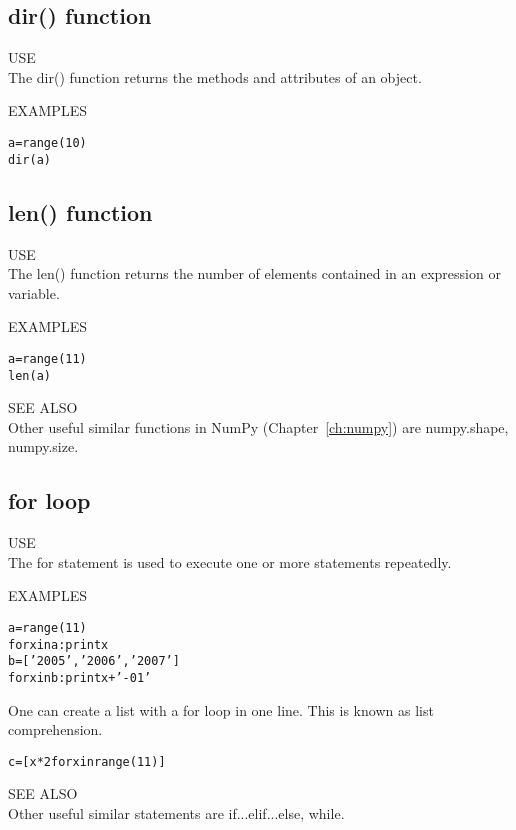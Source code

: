 \subsection{ {\sf dir() } function}
{\color{blue} {\sf\small USE}} \\
The {\sf\small dir()} function returns the methods and attributes of
an object.
  
{\color{blue} {\sf\small EXAMPLES}} 
\begin{alltt}
\pytab a = range(10) 
\pytab dir(a) 
\end{alltt}

\subsection{ {\sf len() } function}
{\color{blue} {\sf\small USE}} \\
The {\sf\small len()} function returns the number of elements
contained in an expression or variable.

{\color{blue} {\sf\small EXAMPLES}} 
\begin{alltt}
\pytab a = range(11) 
\pytab len(a) 
\end{alltt}
{\color{blue} {\sf\small SEE ALSO}} \\
Other useful similar functions in NumPy (Chapter~\ref{ch:numpy}) are
{\sf\small numpy.shape, numpy.size}.


\subsection{ {\sf for } loop}
{\color{blue} {\sf\small USE}} \\
The {\sf\small for } statement is used to execute one or more
statements repeatedly.

{\color{blue} {\sf\small EXAMPLES}} 
\begin{alltt}
\pytab a = range(11)
\pytab for x in a: print x
\pytab b = ['2005', '2006', '2007']
\pytab for x in b: print x + '-01'
\end{alltt}

One can create a list with a for loop in one line.  This is known as list
comprehension.

\begin{alltt}
\pytab  c = [x*2 for x in range(11)]
\end{alltt}
  
{\color{blue} {\sf\small SEE ALSO}} \\
Other useful similar statements are {\sf\small if...elif...else, while}.  \\

